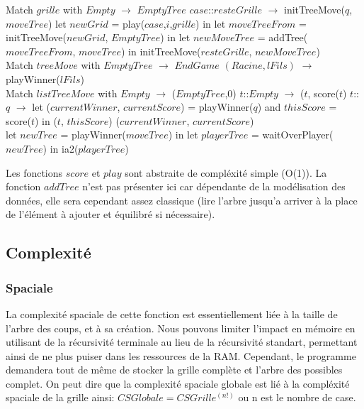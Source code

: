 \documentclass[a4paper,12pt]{report}
\begin{document}
\begin{algorithmic}
	\State Match $grille$ with
	\State $Empty$ $\rightarrow$ $EmptyTree$
	\State $case$::$resteGrille$ $\rightarrow$
			initTreeMove($q$, $moveTree$)
		\Else
				\State let $newGrid$ = play($case$,$i$,$grille$) in
				\State let $moveTreeFrom$ = initTreeMove($newGrid$, $EmptyTree$) in
				\State let $newMoveTree$ = addTree($moveTreeFrom$, $moveTree$) in
				\State initTreeMove($resteGrille$, $newMoveTree$)
			\EndFor
		\EndIf
\EndFunction
\\
	\State Match $treeMove$ with
	\State $EmptyTree$ $\rightarrow$ $EndGame$
	\State $(Racine, lFils)$ $\rightarrow$ playWinner($lFils$)
\EndFunction
\\
	\State Match $listTreeMove$ with
	\State $Empty$ $\rightarrow$ ($EmptyTree$,0)
	\State $t$::$Empty$ $\rightarrow$ ($t$, score($t$)
	\State $t$::$q$ $\rightarrow$ let ($currentWinner$, $currentScore$) = playWinner($q$) and $thisScore$ = score($t$) in
			\State ($t$, $thisScore$)
		\Else
			\State ($currentWinner$, $currentScore$)
		\EndIf
\EndFunction
\\
	\State let $newTree$ = playWinner($moveTree$) in
	\State let $playerTree$ = waitOverPlayer($newTree$) in
	\State ia2($playerTree$)
\EndFunction
\end{algorithmic}
Les fonctions $score$ et $play$ sont abstraite de compl\'exit\'e simple (O(1)). La fonction $addTree$ n'est pas pr\'esenter ici car d\'ependante de la mod\'elisation des donn\'ees, elle sera cependant assez classique (lire l'arbre jusqu'a arriver \`a la place de l'\'el\'ement \`a ajouter et \'equilibr\'e si n\'ecessaire).

\subsection{Complexit\'e}

\subsubsection{Spaciale}

La complexit\'e spaciale de cette fonction est essentiellement li\'ee \`a la taille de l'arbre des coups, et \`a sa cr\'eation. Nous pouvons limiter l'impact en m\'emoire en utilisant de la r\'ecursivit\'e terminale au lieu de la r\'ecursivit\'e standart, permettant ainsi de ne plus puiser dans les ressources de la RAM. Cependant, le programme demandera tout de m\^eme de stocker la grille compl\`ete et l'arbre des possibles complet. On peut dire que la complexit\'e spaciale globale est li\'e \`a la compl\'exit\'e spaciale de la grille ainsi: $CSGlobale=CSGrille^(n!)$ ou n est le nombre de case. 
\end{document}
